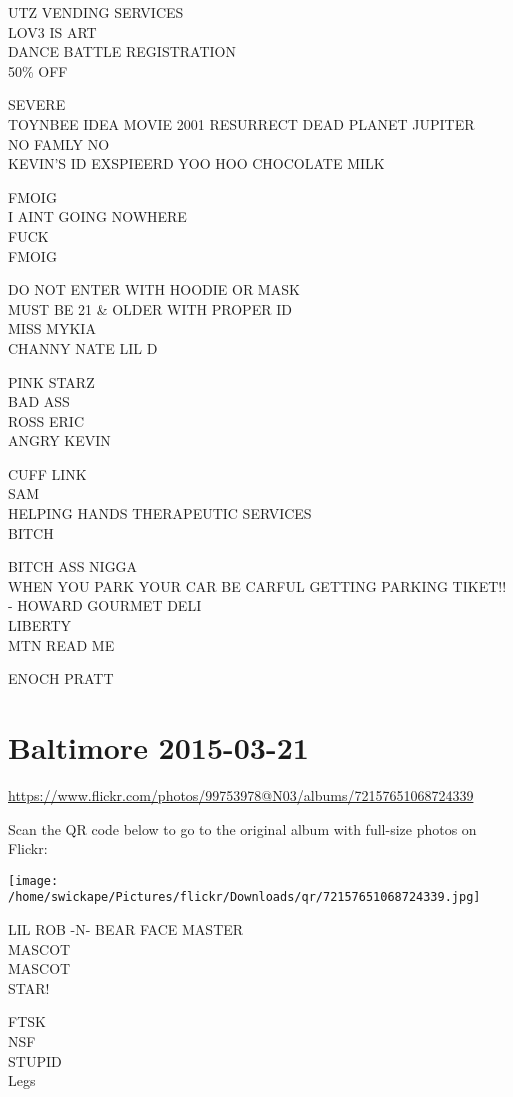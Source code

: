 \documentclass[10pt,letterpaper]{article}
\begin{document}
UTZ VENDING SERVICES\\
LOV3 IS ART\\
DANCE BATTLE REGISTRATION\\
50\% OFF

SEVERE\\
TOYNBEE IDEA MOVIE 2001 RESURRECT DEAD PLANET JUPITER\\
NO FAMLY NO\\
KEVIN'S ID EXSPIEERD YOO HOO CHOCOLATE MILK

FMOIG\\
I AINT GOING NOWHERE\\
FUCK\\
FMOIG

DO NOT ENTER WITH HOODIE OR MASK\\
MUST BE 21 \& OLDER WITH PROPER ID\\
MISS MYKIA\\
CHANNY NATE LIL D

PINK STARZ\\
BAD ASS\\
ROSS ERIC\\
ANGRY KEVIN

CUFF LINK\\
SAM\\
HELPING HANDS THERAPEUTIC SERVICES\\
BITCH

BITCH ASS NIGGA\\
WHEN YOU PARK YOUR CAR BE CARFUL GETTING PARKING TIKET!! {-} HOWARD GOURMET DELI\\
LIBERTY\\
MTN READ ME

ENOCH PRATT


\section*{Baltimore 2015-03-21}

\url{https://www.flickr.com/photos/99753978@N03/albums/72157651068724339}

Scan the QR code below to go to the original album with full-size photos on Flickr:

\texttt{[image: /home/swickape/Pictures/flickr/Downloads/qr/72157651068724339.jpg]}


LIL ROB {-}N{-} BEAR FACE MASTER\\
MASCOT\\
MASCOT\\
STAR!

FTSK\\
NSF\\
STUPID\\
Legs
\end{document}
